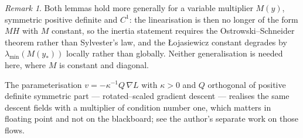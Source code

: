 \documentclass[11pt]{article}
\theoremstyle{plain}
\theoremstyle{definition}
\theoremstyle{remark}
\newtheorem{remark}[theorem]{Remark}
\newcommand{\grad}{\nabla}
\begin{document}
\begin{remark}\label{rem:rsgd}
Both lemmas hold more generally for a variable multiplier $M(y)$, symmetric
positive definite and $C^1$: the linearisation is then no longer of the form
$MH$ with $M$ constant, so the inertia statement requires the
Ostrowski--Schneider theorem rather than Sylvester's law, and the
{\L}ojasiewicz constant degrades by $\lambda_{\min}(M(y_*))$ locally rather
than globally. Neither generalisation is needed here, where $M$ is constant
and diagonal.

The parameterisation $v = -\kappa^{-1}Q\,\grad L$ with $\kappa > 0$ and $Q$
orthogonal of positive definite symmetric part --- rotated--scaled gradient
descent --- realises the same descent fields with a multiplier of condition
number one, which matters in floating point and not on the blackboard; see
the author's separate work on those flows.
\end{remark}
\end{document}
